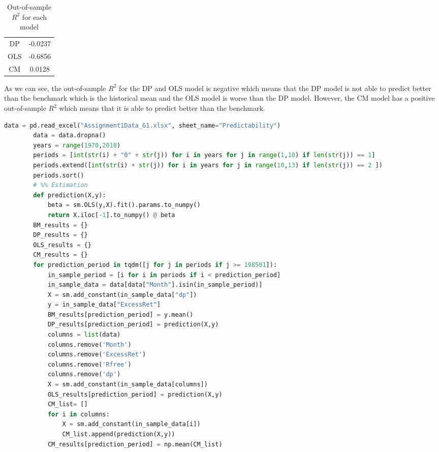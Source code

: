 \begin{enumerate}[(a)]
\begin{table}[H]
\begin{tabular}{c|c}
            \hline
            DP & -0.0237 \\
            OLS & -0.6856 \\
            CM & 0.0128 \\
        \end{tabular}
        \caption{Out-of-sample $R^2$ for each model}
        \label{tab:my_label}
    \end{table}
    As we can see, the out-of-sample $R^2$ for the DP and OLS model is negative which means that the DP model is not able to predict better than the benchmark which is the historical mean and the OLS model is worse than the DP model. However, the CM model has a positive out-of-sample $R^2$ which means that it is able to predict better than the benchmark. 

    \begin{lstlisting}[language=Python, caption=Python code for prediction, label={lst:q1a}, escapechar=|, frame=single, basicstyle=\small, showstringspaces=false, captionpos=b, breaklines=true, showspaces=false, showtabs=false, keywordstyle=\color{blue}, commentstyle=\color{gray}]
        data = pd.read_excel("Assignment1Data_G1.xlsx", sheet_name="Predictability")
        data = data.dropna()
        years = range(1970,2018)
        periods = [int(str(i) + "0" + str(j)) for i in years for j in range(1,10) if len(str(j)) == 1]
        periods.extend([int(str(i) + str(j)) for i in years for j in range(10,13) if len(str(j)) == 2 ])
        periods.sort()
        # %% Estimation
        def prediction(X,y):
            beta = sm.OLS(y,X).fit().params.to_numpy()
            return X.iloc[-1].to_numpy() @ beta
        BM_results = {}
        DP_results = {}
        OLS_results = {}
        CM_results = {}
        for prediction_period in tqdm([j for j in periods if j >= 198501]):
            in_sample_period = [i for i in periods if i < prediction_period]
            in_sample_data = data[data["Month"].isin(in_sample_period)]
            X = sm.add_constant(in_sample_data["dp"])
            y = in_sample_data["ExcessRet"]
            BM_results[prediction_period] = y.mean()
            DP_results[prediction_period] = prediction(X,y)
            columns = list(data)
            columns.remove('Month')
            columns.remove('ExcessRet')
            columns.remove('Rfree')
            columns.remove('dp')
            X = sm.add_constant(in_sample_data[columns])
            OLS_results[prediction_period] = prediction(X,y)
            CM_list= []
            for i in columns:
                X = sm.add_constant(in_sample_data[i])
                CM_list.append(prediction(X,y))
            CM_results[prediction_period] = np.mean(CM_list)
    \end{lstlisting}
    

\end{enumerate}
